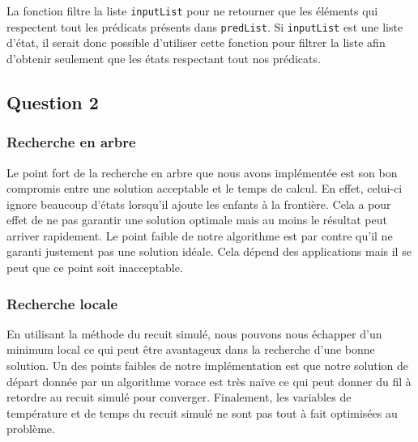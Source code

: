 \documentclass[a4paper, 12pt]{article} %
\begin{document}
La fonction filtre la liste \texttt{inputList} pour ne retourner que les éléments qui respectent tout les prédicats présents dans \texttt{predList}.
Si \texttt{inputList} est une liste d'état, il serait donc possible d'utiliser cette fonction pour filtrer la liste afin d'obtenir seulement que les états 
respectant tout nos prédicats.

\subsection*{Question 2}
\subsubsection*{Recherche en arbre}
Le point fort de la recherche en arbre que nous avons implémentée est son bon compromis entre une solution
acceptable et le temps de calcul. En effet, celui-ci ignore beaucoup d'états lorsqu'il ajoute les enfants à la frontière.
Cela a pour effet de ne pas garantir une solution optimale mais au moins le résultat peut arriver rapidement.
Le point faible de notre algorithme est par contre qu'il ne garanti justement pas une solution idéale. Cela dépend
des applications mais il se peut que ce point soit inacceptable.

\subsubsection*{Recherche locale}
En utilisant la méthode du recuit simulé, nous pouvons nous échapper d'un minimum local ce qui peut être avantageux
dans la recherche d'une bonne solution. Un des points faibles de notre implémentation est que notre solution de départ
donnée par un algorithme vorace est très naïve ce qui peut donner du fil à retordre au recuit simulé pour converger.
Finalement, les variables de température et de temps du recuit simulé ne sont pas tout à fait optimisées au problème.

\end{document}
